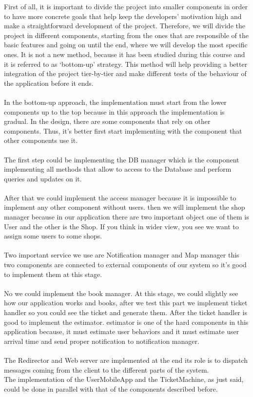First of all, it is important to divide the project into smaller components in order to have more concrete goals that help keep the developers’ motivation high and make a straightforward development of the project. Therefore, we will divide the project in different components, starting from the ones that are responsible of the basic features and going on until the end, where we will develop the most specific ones. It is not a new method, because it has been studied during this course and it is referred to as ‘bottom-up’ strategy. This method will help providing a better integration of the project tier-by-tier and make different tests of the behaviour of the application before it ends.\\ \\
In the bottom-up approach, the implementation must start from the lower components up to the top because in this approach the implementation is gradual. In the design, there are some components that rely on other components. Thus, it's better first start implementing with the component that other components use it.\\ \\
The first step could be implementing the DB manager which is the component implementing all methods that allow to access to the Database and perform queries and updates on it.\\ \\
After that we could implement the access manager because it is impossible to implement any other component without users. then we will implement the shop manager because in our application there are two important object one of them is User and the other is the Shop. If you think in wider view, you see we want to assign some users to some shops.\\ \\
Two important service we use are Notification manager and Map manager this two components are connected to external components of our system so it's good to implement them at this stage.\\ \\
No we could implement the book manager. At this stage, we could slightly see how our application works and books, after we test this part we implement ticket handler so you could see the ticket and generate them. After the ticket handler is good to implement the estimator. estimator is one of the hard components in this application because, it must estimate user behaviors and it must estimate user arrival time and send proper notification to notification manager.\\ \\
The Redirector and Web server are implemented at the end its role is to dispatch messages coming from the client to the different parts of the system.\\
The implementation of the UserMobileApp and the TicketMachine, as just said, could be done in parallel with that of the components described before.

